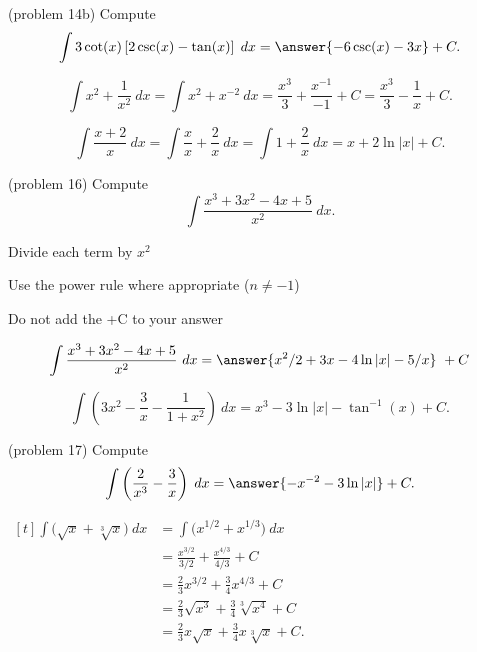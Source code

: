 \documentclass[handout]{ximera}
\begin{document}
\begin{problem}(problem 14b)
Compute
\[
\int 3\cot(x)\left[2\csc(x) - \tan(x)\right]\; dx = \answer{-6\csc(x) - 3x} + C.
\]
\end{problem}



\begin{example}[example 15]
\[
\int x^2 + \dfrac{1}{x^2} \ dx = \int x^2 + x^{-2} \ dx = \dfrac{x^3}{3} + \dfrac{x^{-1}}{-1} + C 
= \dfrac{x^3}{3} - \dfrac{1}{x} + C.
\]

\end{example}


\begin{example}[example 16]
\[
\int \dfrac{x+2}{x} \ dx = \int \dfrac{x}{x} + \dfrac{2}{x} \ dx = \int 1 + \dfrac{2}{x} \ dx = x + 2\ln|x| +C.
\]

\end{example}


\begin{problem}(problem 16)
Compute
\[
\int \dfrac{x^3 + 3x^2 - 4x + 5}{x^2} \ dx.
\]

\begin{hint}
Divide each term by $x^2$
\end{hint}
\begin{hint}
Use the power rule where appropriate ($n\neq -1$)
\end{hint}
\begin{hint}
\begin{center}
Do not add the +C to your answer
\end{center}
\end{hint}

\[
\int  \dfrac{x^3 + 3x^2 - 4x + 5}{x^2} \ dx =
\answer{x^2 /2 + 3x - 4\ln|x| -5/x} \ +  C
\]
\end{problem}



\begin{example}[example 17]
\[
\int \left(3x^2 - \dfrac{3}{x} - \dfrac{1}{1+x^2}\right) \ dx = x^3 - 3\ln|x| - \tan^{-1}(x) + C.
\]
\end{example}


\begin{problem}(problem 17)
Compute
\[
\int \left(\frac{2}{x^3} - \frac{3}{x} \right) \; dx = \answer{-x^{-2} -3\ln|x|} + C.
\]
\end{problem}

\begin{example}[example 18]
$\begin{aligned}[t]
\int \big(\sqrt x + \sqrt[3] x \big) \ dx &= \int \big(x^{1/2} + x^{1/3}\big) \ dx \\
&= \frac{x^{3/2}}{3/2} + \frac{x^{4/3}}{4/3} + C \\
&= \tfrac{2}{3} x^{3/2} + \tfrac{3}{4} x^{4/3} + C \\
&= \tfrac{2}{3} \sqrt {x^3} + \tfrac{3}{4}  \sqrt[3] {x^4} + C \\
&= \tfrac{2}{3} x\sqrt x + \tfrac{3}{4} x \sqrt[3] x + C.
\end{aligned}$
\end{example}
\end{document}

